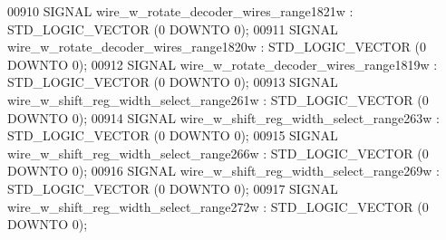 \begin{DoxyCode}
{00910      \textcolor{keywordflow}{SIGNAL}  \textcolor{vhdlchar}{wire_w_rotate_decoder_wires_range1821w} \textcolor{vhdlchar}{:}   \textcolor{comment}{STD\_LOGIC\_VECTOR} \textcolor{vhdlchar}{(}\textcolor{vhdllogic}{}\textcolor{vhdllogic}{0} \textcolor{keywordflow}{DOWNTO} \textcolor{vhdllogic}{}\textcolor{vhdllogic}{0}\textcolor{vhdlchar}{)};
00911      \textcolor{keywordflow}{SIGNAL}  \textcolor{vhdlchar}{wire_w_rotate_decoder_wires_range1820w} \textcolor{vhdlchar}{:}   \textcolor{comment}{STD\_LOGIC\_VECTOR} \textcolor{vhdlchar}{(}\textcolor{vhdllogic}{}\textcolor{vhdllogic}{0} \textcolor{keywordflow}{DOWNTO} \textcolor{vhdllogic}{}\textcolor{vhdllogic}{0}\textcolor{vhdlchar}{)};
00912      \textcolor{keywordflow}{SIGNAL}  \textcolor{vhdlchar}{wire_w_rotate_decoder_wires_range1819w} \textcolor{vhdlchar}{:}   \textcolor{comment}{STD\_LOGIC\_VECTOR} \textcolor{vhdlchar}{(}\textcolor{vhdllogic}{}\textcolor{vhdllogic}{0} \textcolor{keywordflow}{DOWNTO} \textcolor{vhdllogic}{}\textcolor{vhdllogic}{0}\textcolor{vhdlchar}{)};
00913      \textcolor{keywordflow}{SIGNAL}  \textcolor{vhdlchar}{wire_w_shift_reg_width_select_range261w}    \textcolor{vhdlchar}{:}   \textcolor{comment}{STD\_LOGIC\_VECTOR} \textcolor{vhdlchar}{(}\textcolor{vhdllogic}{}\textcolor{vhdllogic}{0} \textcolor{keywordflow}{DOWNTO} \textcolor{vhdllogic}{}\textcolor{vhdllogic}{0}\textcolor{vhdlchar}{)};
00914      \textcolor{keywordflow}{SIGNAL}  \textcolor{vhdlchar}{wire_w_shift_reg_width_select_range263w}    \textcolor{vhdlchar}{:}   \textcolor{comment}{STD\_LOGIC\_VECTOR} \textcolor{vhdlchar}{(}\textcolor{vhdllogic}{}\textcolor{vhdllogic}{0} \textcolor{keywordflow}{DOWNTO} \textcolor{vhdllogic}{}\textcolor{vhdllogic}{0}\textcolor{vhdlchar}{)};
00915      \textcolor{keywordflow}{SIGNAL}  \textcolor{vhdlchar}{wire_w_shift_reg_width_select_range266w}    \textcolor{vhdlchar}{:}   \textcolor{comment}{STD\_LOGIC\_VECTOR} \textcolor{vhdlchar}{(}\textcolor{vhdllogic}{}\textcolor{vhdllogic}{0} \textcolor{keywordflow}{DOWNTO} \textcolor{vhdllogic}{}\textcolor{vhdllogic}{0}\textcolor{vhdlchar}{)};
00916      \textcolor{keywordflow}{SIGNAL}  \textcolor{vhdlchar}{wire_w_shift_reg_width_select_range269w}    \textcolor{vhdlchar}{:}   \textcolor{comment}{STD\_LOGIC\_VECTOR} \textcolor{vhdlchar}{(}\textcolor{vhdllogic}{}\textcolor{vhdllogic}{0} \textcolor{keywordflow}{DOWNTO} \textcolor{vhdllogic}{}\textcolor{vhdllogic}{0}\textcolor{vhdlchar}{)};
00917      \textcolor{keywordflow}{SIGNAL}  \textcolor{vhdlchar}{wire_w_shift_reg_width_select_range272w}    \textcolor{vhdlchar}{:}   \textcolor{comment}{STD\_LOGIC\_VECTOR} \textcolor{vhdlchar}{(}\textcolor{vhdllogic}{}\textcolor{vhdllogic}{0} \textcolor{keywordflow}{DOWNTO} \textcolor{vhdllogic}{}\textcolor{vhdllogic}{0}\textcolor{vhdlchar}{)};
}
\end{DoxyCode}

